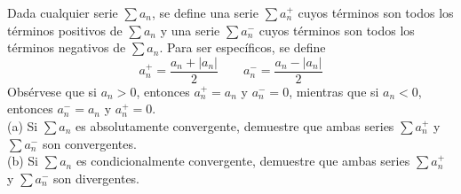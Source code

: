 \item Dada cualquier serie $\sum a_n$, se define una serie $\sum a_n^+$ cuyos términos son todos los términos positivos de $\sum a_n$ y una serie $\sum a_n^-$ cuyos términos son todos los términos negativos de $\sum a_n$. Para ser específicos, se define
    \[ a_n^+ = \frac{a_n + |a_n|}{2} \qquad a_n^- = \frac{a_n - |a_n|}{2} \]
    Obsérvese que si $a_n > 0$, entonces $a_n^+ = a_n$ y $a_n^- = 0$, mientras que si $a_n < 0$, entonces $a_n^- = a_n$ y $a_n^+ = 0$. \\
    (a) Si $\sum a_n$ es absolutamente convergente, demuestre que ambas series $\sum a_n^+$ y $\sum a_n^-$ son convergentes. \\
    (b) Si $\sum a_n$ es condicionalmente convergente, demuestre que ambas series $\sum a_n^+$ y $\sum a_n^-$ son divergentes.
